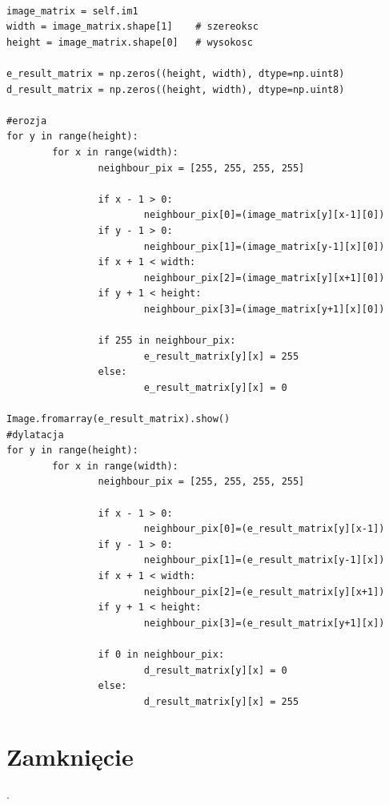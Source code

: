 \documentclass[final,a4paper,openany,12pt]{mwbk}
\begin{document}
\begin{lstlisting}[caption= Operacja otwarcia na obrazie binarnym]

image_matrix = self.im1
width = image_matrix.shape[1]    # szereoksc
height = image_matrix.shape[0]   # wysokosc

e_result_matrix = np.zeros((height, width), dtype=np.uint8)
d_result_matrix = np.zeros((height, width), dtype=np.uint8)

#erozja
for y in range(height):
        for x in range(width):  
                neighbour_pix = [255, 255, 255, 255]

                if x - 1 > 0:
                        neighbour_pix[0]=(image_matrix[y][x-1][0])
                if y - 1 > 0:
                        neighbour_pix[1]=(image_matrix[y-1][x][0])
                if x + 1 < width:
                        neighbour_pix[2]=(image_matrix[y][x+1][0])
                if y + 1 < height:
                        neighbour_pix[3]=(image_matrix[y+1][x][0])

                if 255 in neighbour_pix:
                        e_result_matrix[y][x] = 255
                else:
                        e_result_matrix[y][x] = 0 

Image.fromarray(e_result_matrix).show()
#dylatacja
for y in range(height):
        for x in range(width):  
                neighbour_pix = [255, 255, 255, 255]

                if x - 1 > 0:
                        neighbour_pix[0]=(e_result_matrix[y][x-1])
                if y - 1 > 0:
                        neighbour_pix[1]=(e_result_matrix[y-1][x])
                if x + 1 < width:
                        neighbour_pix[2]=(e_result_matrix[y][x+1])
                if y + 1 < height:
                        neighbour_pix[3]=(e_result_matrix[y+1][x])

                if 0 in neighbour_pix:
                        d_result_matrix[y][x] = 0
                else:
                        d_result_matrix[y][x] = 255   

\end{lstlisting}

\section{ Zamknięcie}
.
\hfill
\\\\
\indent
\end{document}
